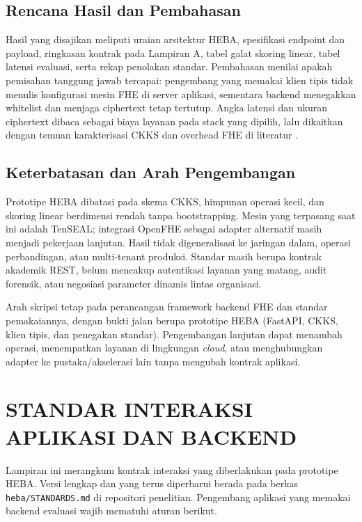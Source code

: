 \documentclass[12pt,a4paper,oneside]{report}
\begin{document}
\section{Rencana Hasil dan Pembahasan}

Hasil yang disajikan meliputi uraian arsitektur HEBA, spesifikasi endpoint dan payload, ringkasan kontrak pada Lampiran A, tabel galat skoring linear, tabel latensi evaluasi, serta rekap penolakan standar. Pembahasan menilai apakah pemisahan tanggung jawab tercapai: pengembang yang memakai klien tipis tidak menulis konfigurasi mesin FHE di server aplikasi, sementara backend menegakkan whitelist dan menjaga ciphertext tetap tertutup. Angka latensi dan ukuran ciphertext dibaca sebagai biaya layanan pada stack yang dipilih, lalu dikaitkan dengan temuan karakterisasi CKKS dan overhead FHE di literatur \cite{brynds2025cryptoracle,fan2026gpuFhe,li2026bootstrappingSurvey,lee2025clusterFhe}.

\section{Keterbatasan dan Arah Pengembangan}

Prototipe HEBA dibatasi pada skema CKKS, himpunan operasi kecil, dan skoring linear berdimensi rendah tanpa bootstrapping. Mesin yang terpasang saat ini adalah TenSEAL; integrasi OpenFHE sebagai adapter alternatif masih menjadi pekerjaan lanjutan. Hasil tidak digeneralisasi ke jaringan dalam, operasi perbandingan, atau multi-tenant produksi. Standar masih berupa kontrak akademik REST, belum mencakup autentikasi layanan yang matang, audit forensik, atau negosiasi parameter dinamis lintas organisasi.

Arah skripsi tetap pada perancangan framework backend FHE dan standar pemakaiannya, dengan bukti jalan berupa prototipe HEBA (FastAPI, CKKS, klien tipis, dan penegakan standar). Pengembangan lanjutan dapat menambah operasi, menempatkan layanan di lingkungan \emph{cloud}, atau menghubungkan adapter ke pustaka/akselerasi lain tanpa mengubah kontrak aplikasi.




\appendix
\chapter{STANDAR INTERAKSI APLIKASI DAN BACKEND}
\label{app:standards}

Lampiran ini merangkum kontrak interaksi yang diberlakukan pada prototipe HEBA. Versi lengkap dan yang terus diperbarui berada pada berkas \texttt{heba/STANDARDS.md} di repositori penelitian. Pengembang aplikasi yang memakai backend evaluasi wajib mematuhi aturan berikut.
\end{document}
